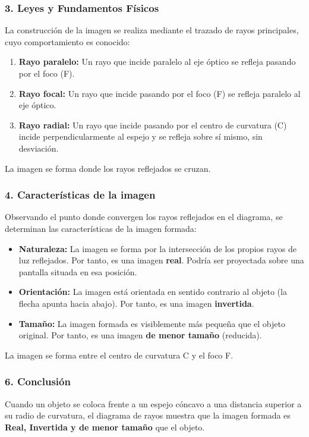 \subsubsection*{3. Leyes y Fundamentos Físicos}
La construcción de la imagen se realiza mediante el trazado de rayos principales, cuyo comportamiento es conocido:
\begin{enumerate}
    \item \textbf{Rayo paralelo:} Un rayo que incide paralelo al eje óptico se refleja pasando por el foco (F).
    \item \textbf{Rayo focal:} Un rayo que incide pasando por el foco (F) se refleja paralelo al eje óptico.
    \item \textbf{Rayo radial:} Un rayo que incide pasando por el centro de curvatura (C) incide perpendicularmente al espejo y se refleja sobre sí mismo, sin desviación.
\end{enumerate}
La imagen se forma donde los rayos reflejados se cruzan.

\subsubsection*{4. Características de la imagen}
Observando el punto donde convergen los rayos reflejados en el diagrama, se determinan las características de la imagen formada:
\begin{itemize}
    \item \textbf{Naturaleza:} La imagen se forma por la intersección de los propios rayos de luz reflejados. Por tanto, es una imagen \textbf{real}. Podría ser proyectada sobre una pantalla situada en esa posición.
    \item \textbf{Orientación:} La imagen está orientada en sentido contrario al objeto (la flecha apunta hacia abajo). Por tanto, es una imagen \textbf{invertida}.
    \item \textbf{Tamaño:} La imagen formada es visiblemente más pequeña que el objeto original. Por tanto, es una imagen \textbf{de menor tamaño} (reducida).
\end{itemize}
La imagen se forma entre el centro de curvatura C y el foco F.

\subsubsection*{6. Conclusión}
\begin{cajaconclusion}
Cuando un objeto se coloca frente a un espejo cóncavo a una distancia superior a su radio de curvatura, el diagrama de rayos muestra que la imagen formada es \textbf{Real, Invertida y de menor tamaño} que el objeto.
\end{cajaconclusion}

